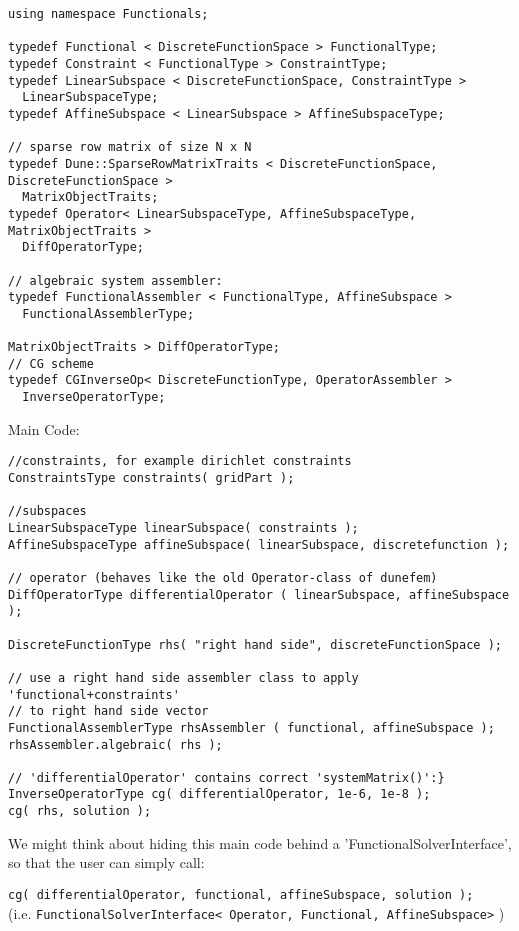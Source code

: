 \documentclass[a4paper,11pt]{article}
\numberwithin{equation}{section}
\newcommand{\CodeT}[1]{\textnormal{\texttt{#1}}}
\begin{document}
\begin{lstlisting}
using namespace Functionals;

typedef Functional < DiscreteFunctionSpace > FunctionalType;
typedef Constraint < FunctionalType > ConstraintType;
typedef LinearSubspace < DiscreteFunctionSpace, ConstraintType >
  LinearSubspaceType;
typedef AffineSubspace < LinearSubspace > AffineSubspaceType;

// sparse row matrix of size N x N
typedef Dune::SparseRowMatrixTraits < DiscreteFunctionSpace, DiscreteFunctionSpace >
  MatrixObjectTraits;
typedef Operator< LinearSubspaceType, AffineSubspaceType, MatrixObjectTraits >
  DiffOperatorType;

// algebraic system assembler:
typedef FunctionalAssembler < FunctionalType, AffineSubspace >
  FunctionalAssemblerType;

MatrixObjectTraits > DiffOperatorType;
// CG scheme
typedef CGInverseOp< DiscreteFunctionType, OperatorAssembler >
  InverseOperatorType;
\end{lstlisting}
Main Code:
\begin{lstlisting}
//constraints, for example dirichlet constraints
ConstraintsType constraints( gridPart );

//subspaces
LinearSubspaceType linearSubspace( constraints );
AffineSubspaceType affineSubspace( linearSubspace, discretefunction );

// operator (behaves like the old Operator-class of dunefem)
DiffOperatorType differentialOperator ( linearSubspace, affineSubspace );

DiscreteFunctionType rhs( "right hand side", discreteFunctionSpace );

// use a right hand side assembler class to apply 'functional+constraints'
// to right hand side vector
FunctionalAssemblerType rhsAssembler ( functional, affineSubspace );
rhsAssembler.algebraic( rhs );

// 'differentialOperator' contains correct 'systemMatrix()':}
InverseOperatorType cg( differentialOperator, 1e-6, 1e-8 );
cg( rhs, solution );
\end{lstlisting}

We might think about hiding this main code behind a 'FunctionalSolverInterface', so that the user can simply call:

\CodeT{\footnotesize cg( differentialOperator, functional, affineSubspace, solution );}\\
(i.e. \CodeT{FunctionalSolverInterface< Operator, Functional, AffineSubspace>} )
\end{document}
